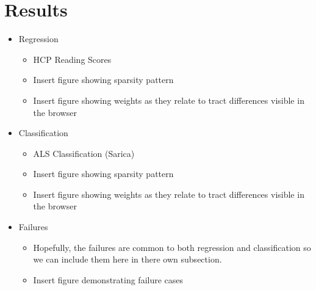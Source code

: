 \section{Results}

\begin{itemize}
  \item Regression
    \begin{itemize}
      \item HCP Reading Scores
      \item Insert figure showing sparsity pattern
      \item Insert figure showing weights as they relate to tract differences visible in the browser
    \end{itemize}
  \item Classification
    \begin{itemize}
      \item ALS Classification (Sarica)
      \item Insert figure showing sparsity pattern
      \item Insert figure showing weights as they relate to tract differences visible in the browser
    \end{itemize}
  \item Failures
    \begin{itemize}
      \item Hopefully, the failures are common to both regression
        and classification so we can include them here in there own
        subsection.
      \item Insert figure demonstrating failure cases
    \end{itemize}
\end{itemize}
